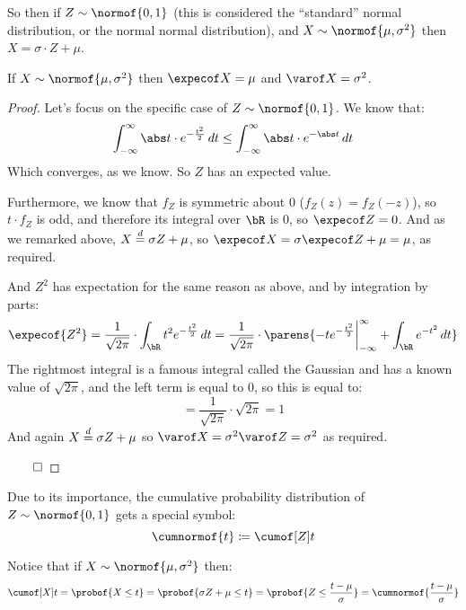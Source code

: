 So then if $Z\sim\normof{0,1}$ (this is considered the ``standard'' normal distribution, or the normal normal distribution), and
$X\sim\normof{\mu,\sigma^2}$ then $X=\sigma\cdot Z+\mu$.

\begin{prop*}

	If $X\sim\normof{\mu,\sigma^2}$ then $\expecof X=\mu$ and $\varof X=\sigma^2$.

\end{prop*}

\begin{proof}

	Let's focus on the specific case of $Z\sim\normof{0,1}$.
	We know that:
	\[ \int_{-\infty}^\infty\abs t\cdot e^{-\frac{t^2}2}\,dt \leq \int_{-\infty}^\infty\abs t\cdot e^{-\abs t}\,dt \]
	Which converges, as we know.
	So $Z$ has an expected value.

	Furthermore, we know that $f_Z$ is symmetric about $0$ ($f_Z(z)=f_Z(-z)$), so $t\cdot f_Z$ is odd, and therefore its integral over $\bR$ is $0$,
	so $\expecof Z=0$.
	And as we remarked above, $X\mathrel{\overset d=}\sigma Z+\mu$, so $\expecof X=\sigma\expecof Z+\mu = \mu$, as required.

	And $Z^2$ has expectation for the same reason as above, and by integration by parts:
	\[ \expecof{Z^2} = \frac1{\sqrt{2\pi}}\cdot\int_\bR t^2 e^{-\frac{t^2}2}\,dt =
	\frac1{\sqrt{2\pi}}\cdot\parens{-t e^{-\frac{t^2}2}\bigg|_{-\infty}^\infty + \int_\bR e^{-t^2}\,dt} \]
	The rightmost integral is a famous integral called the Gaussian and has a known value of $\sqrt{2\pi}$, and the left term is equal to $0$, so this is
	equal to:
	\[ = \frac1{\sqrt{2\pi}}\cdot\sqrt{2\pi} = 1 \]
	And again $X\mathrel{\overset d=}\sigma Z+\mu$ so $\varof X=\sigma^2\varof Z=\sigma^2$ as required.

	\hfill$\qed$

\end{proof}

\begin{defn*}

	Due to its importance, the cumulative probability distribution of $Z\sim\normof{0,1}$ gets a special symbol:
	\[ \cumnormof{t}\coloneqq\cumof[Z]t \]

\end{defn*}

Notice that if $X\sim\normof{\mu,\sigma^2}$ then:
\[ \cumof[X]t = \probof{X\leq t} = \probof{\sigma Z+\mu\leq t} = \probof{Z\leq \frac{t-\mu}\sigma} = \cumnormof{\frac{t-\mu}\sigma} \]

